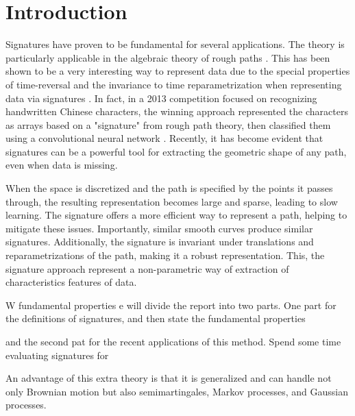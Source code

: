 \section{Introduction}\label{sec:introduction}


Signatures have proven to be fundamental for several applications. The theory is particularly applicable in the algebraic theory of rough paths \cite{geng2021introduction, geng2017reconstruction, fermanian2023new}. This has been shown to be a very interesting way to represent data due to the special properties of time-reversal and the invariance to time reparametrization when representing data via signatures \cite{chevyrev2016primer}. In fact, in a 2013 competition focused on recognizing handwritten Chinese characters, the winning approach represented the characters as arrays based on a "signature" from rough path theory, then classified them using a convolutional neural network \cite{yin2013icdar}. Recently, it has become evident that signatures can be a powerful tool for extracting the geometric shape of any path, even when data is missing.

When the space is discretized and the path is specified by the points it passes through, the resulting representation becomes large and sparse, leading to slow learning. The signature offers a more efficient way to represent a path, helping to mitigate these issues. Importantly, similar smooth curves produce similar signatures. Additionally, the signature is invariant under translations and reparametrizations of the path, making it a robust representation. This, the signature approach represent a non-parametric way of extraction of characteristics features of data.


W fundamental properties e will divide the report into two parts. One part for the  definitions of signatures, and then state the fundamental properties

and the second pat for the recent applications of this method. Spend some time evaluating signatures for

An advantage of this extra theory is that it is generalized and can handle not only Brownian motion but also semimartingales, Markov processes, and Gaussian processes.



